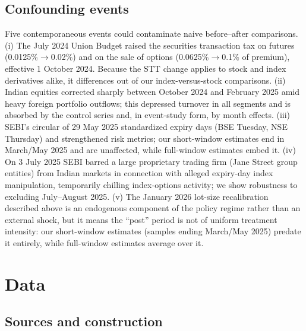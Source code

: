 \documentclass[12pt]{article}
\begin{document}
\subsection{Confounding events}\label{subsec:confounds}

Five contemporaneous events could contaminate naive before--after
comparisons. (i) The July 2024 Union Budget raised the securities
transaction tax on futures (0.0125\%$\rightarrow$0.02\%) and on the sale of
options (0.0625\%$\rightarrow$0.1\% of premium), effective 1 October 2024.
Because the STT change applies to stock and index derivatives alike, it
differences out of our index-versus-stock comparisons. (ii) Indian equities
corrected sharply between October 2024 and February 2025 amid heavy foreign
portfolio outflows; this depressed turnover in all segments and is absorbed
by the control series and, in event-study form, by month effects.
(iii) SEBI's circular of 29 May 2025 standardized expiry days (BSE Tuesday,
NSE Thursday) and strengthened risk metrics; our short-window estimates end
in March/May 2025 and are unaffected, while full-window estimates embed it.
(iv) On 3 July 2025 SEBI barred a large proprietary trading firm (Jane
Street group entities) from Indian markets in connection with alleged
expiry-day index manipulation, temporarily chilling index-options activity;
we show robustness to excluding July--August 2025. (v) The January 2026
lot-size recalibration described above is an endogenous component of the
policy regime rather than an external shock, but it means the ``post''
period is not of uniform treatment intensity: our short-window estimates
(samples ending March/May 2025) predate it entirely, while full-window
estimates average over it.

\section{Data}\label{sec:data}

\subsection{Sources and construction}
\end{document}
